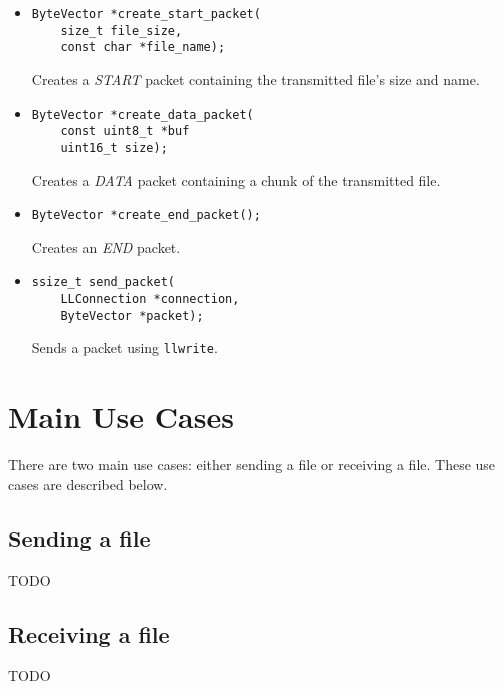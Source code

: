 \documentclass[11pt,a4paper,twocolumn]{article}
\begin{document}
\begin{itemize}
    \item \begin{lstlisting}
ByteVector *create_start_packet(
    size_t file_size, 
    const char *file_name);
    \end{lstlisting}

          Creates a \textit{START} packet containing the transmitted file's size and name.

    \item \begin{lstlisting}
ByteVector *create_data_packet(
    const uint8_t *buf
    uint16_t size);
    \end{lstlisting}

          Creates a \textit{DATA} packet containing a chunk of the transmitted file.

    \item \begin{lstlisting}
ByteVector *create_end_packet();
    \end{lstlisting}

          Creates an \textit{END} packet.

    \item \begin{lstlisting}
ssize_t send_packet(
    LLConnection *connection,
    ByteVector *packet);
    \end{lstlisting}

          Sends a packet using \lstinline{llwrite}.

\end{itemize}

\section{Main Use Cases}

There are two main use cases: either sending a file or receiving a file.
These use cases are described below.

\subsection{Sending a file}

TODO

\subsection{Receiving a file}

TODO
\end{document}
